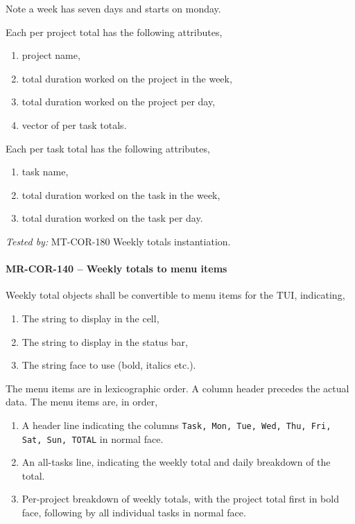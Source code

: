 Note a week has seven days and starts on monday.

Each per project total has the following attributes,
\begin{enumerate}
\item project name,
\item total duration worked on the project in the week,
\item total duration worked on the project per day,
\item vector of per task totals.
\end{enumerate}

Each per task total has the following attributes,
\begin{enumerate}
\item task name,
\item total duration worked on the task in the week,
\item total duration worked on the task per day.
\end{enumerate}

\textit{Tested by: } MT-COR-180 Weekly totals instantiation.

\paragraph{MR-COR-140 -- Weekly totals to menu items}
Weekly total objects shall be convertible to menu items for the TUI,
indicating,
\begin{enumerate}
\item The string to display in the cell,
\item The string to display in the status bar,
\item The string face to use (bold, italics etc.).
\end{enumerate}

The menu items are in lexicographic order. A column header
precedes the actual data. The menu items are, in order,
\begin{enumerate}
\item A header line indicating the columns
  \lstinline{Task, Mon, Tue, Wed, Thu, Fri, Sat, Sun, TOTAL} in normal face.
\item An all-tasks line, indicating the weekly total and daily breakdown of
  the total.
\item Per-project breakdown of weekly totals, with the project total first
  in bold face, following by all individual tasks in normal face.
\end{enumerate}

